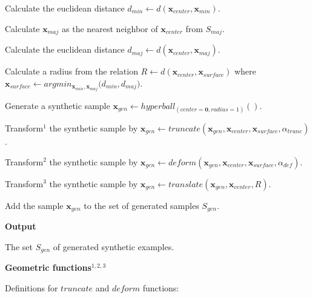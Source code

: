 \documentclass[parskip=full]{scrartcl}
\begin{document}
\begin{algorithm}
\begin{algorithm}
\begin{algorithm}
			\item Calculate the euclidean distance \( d_{min} \leftarrow d(\textbf{x}_{center}, \textbf{x}_{min}) \).
			
			\item Calculate \( \textbf{x}_{maj} \) as the nearest neighbor of \( \textbf{x}_{center} \) from \( S_{maj} \).
			
			\item Calculate the euclidean distance \( d_{maj} \leftarrow d(\textbf{x}_{center}, \textbf{x}_{maj}) \).
			
			\item Calculate a radius from the relation \( R \leftarrow d(\textbf{x}_{center}, \textbf{x}_{surface}) \) where \\ \( \textbf{x}_{surface} \leftarrow \displaystyle argmin_{\textbf{x}_{min}, \textbf{x}_{maj}} \Big(d_{min}, d_{maj} \Big) \).
			
		\end{algorithm}
	
		\item Generate a synthetic sample \( \textbf{x}_{gen} \leftarrow hyperball_{(center = \textbf{0}, radius = 1)}() \).
		
		\item Transform\( ^{1} \) the synthetic sample by \( \textbf{x}_{gen} \leftarrow truncate(\textbf{x}_{gen}, \textbf{x}_{center}, \textbf{x}_{surface}, \alpha_{trunc}) \).
		
		\item Transform\( ^{2} \) the synthetic sample by \( \textbf{x}_{gen} \leftarrow deform(\textbf{x}_{gen}, \textbf{x}_{center}, \textbf{x}_{surface}, \alpha_{def}) \).
		
		\item Transform\( ^{3} \) the synthetic sample by \( \textbf{x}_{gen} \leftarrow translate(\textbf{x}_{gen}, \textbf{x}_{center}, R) \).
		
		\item Add the sample \( \textbf{x}_{gen} \) to the set of generated samples \( S_{gen} \).


	\end{algorithm}

\end{algorithm}

\textbf{Output}

The set \( S_{gen} \) of generated synthetic examples.

\textbf{Geometric functions}\( ^{1, 2, 3} \)  

Definitions for \( truncate \) and \( deform \) functions:
\end{document}
